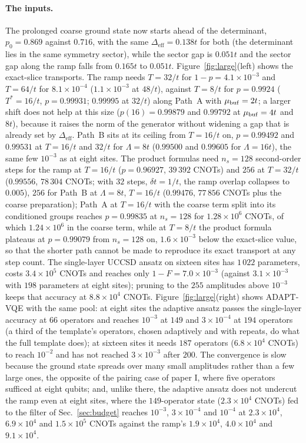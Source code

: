 \documentclass[a4paper,11pt,noarxiv]{quantumarticle}
\newcommand{\Deff}{\Delta_{\mathrm{eff}}}
\begin{document}
\paragraph{The inputs.}
The prolonged coarse ground state now starts ahead of the determinant,
$p_0=0.869$ against $0.716$, with the same $\Deff=0.138t$ for both (the
determinant lies in the same symmetry sector), while the sector gap is
$0.051t$ and the sector gap along the ramp falls from $0.165t$ to $0.051t$.
Figure~\ref{fig:large}(left) shows the exact-slice transports.  The ramp
needs $T=32/t$ for $1-p=4.1\times10^{-3}$ and $T=64/t$ for $8.1\times10^{-4}$
($1.1\times10^{-3}$ at $48/t$), against $T=8/t$ for $p=0.9924$
($T^*=16/t$, $p=0.99931$; $0.99995$ at $32/t$) along Path~A with
$\mu_{\rm buf}=2t$; a larger shift does not help at this
size ($p(16)=0.99879$ and $0.99792$ at $\mu_{\rm buf}=4t$ and $8t$), because
it raises the norm of the generator without widening a gap that is already
set by $\Deff$.  Path~B sits at its ceiling from $T=16/t$ on, $p=0.99492$ and $0.99531$
at $T=16/t$ and $32/t$ for $\Lambda=8t$ ($0.99500$ and $0.99605$ for
$\Lambda=16t$), the same few $10^{-3}$ as at eight sites.  The product
formulas need $n_s=128$ second-order steps for the ramp at $T=16/t$
($p=0.96927$, $39\,392$ CNOTs) and $256$ at $T=32/t$ ($0.99556$, $78\,304$
CNOTs; with $32$ steps, $\delta t=1/t$, the ramp overlap collapses to
$0.005$), $256$ for Path~B at $\Lambda=8t$, $T=16/t$ ($0.99476$, $77\,856$
CNOTs plus the coarse preparation); Path~A at
$T=16/t$ with the coarse term split into its conditioned groups reaches
$p=0.99835$ at $n_s=128$ for $1.28\times10^6$ CNOTs, of which
$1.24\times10^6$ in the coarse term, while at $T=8/t$ the product formula
plateaus at $p=0.99079$ from $n_s=128$ on, $1.6\times10^{-3}$ below the
exact-slice value, so that the shorter path cannot be made to reproduce its
exact transport at any step count.  The single-layer UCCSD ansatz on
sixteen sites has $1\,022$ parameters, costs $3.4\times10^5$ CNOTs and
reaches only $1-F=7.0\times10^{-3}$ (against $3.1\times10^{-3}$ with $198$
parameters at eight sites); pruning to the $255$ amplitudes above
$10^{-3}$ keeps that accuracy at $8.8\times10^4$ CNOTs.
Figure~\ref{fig:large}(right) shows ADAPT-VQE with the same pool: at eight
sites the adaptive ansatz passes the single-layer accuracy at $66$
operators and reaches $10^{-3}$ at $149$ and $3\times10^{-4}$ at $194$
operators (a third of the template's operators, chosen adaptively and
with repeats, do what the full template does); at sixteen sites it
needs $187$ operators ($6.8\times10^4$ CNOTs) to reach $10^{-2}$ and has
not reached $3\times10^{-3}$ after $200$.  The convergence is slow because
the ground state spreads over many small amplitudes rather than a few large
ones, the opposite of the pairing case of paper I, where five operators
sufficed at eight qubits; and, unlike there, the adaptive ansatz does not
undercut the ramp even at eight sites, where the $149$-operator state
($2.3\times10^4$ CNOTs) fed to the filter of Sec.~\ref{sec:budget} reaches
$10^{-3}$, $3\times10^{-4}$ and $10^{-4}$ at $2.3\times10^4$,
$6.9\times10^4$ and $1.5\times10^5$ CNOTs against the ramp's
$1.9\times10^4$, $4.0\times10^4$ and $9.1\times10^4$.
\end{document}

